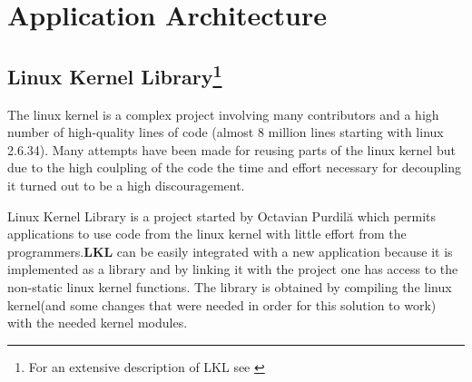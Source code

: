 \chapter{Application Architecture}
\label{chapter:arch}

\section[Linux Kernel Library]{Linux Kernel Library\footnote{For an extensive description of LKL see \cite{thesis}}}
\label{sec:lkl}
The linux kernel is a complex project involving many contributors and a high number of high-quality lines of code (almost 8 million lines starting with linux 2.6.34). Many attempts have been made for reusing parts of the linux kernel but due to the high coulpling of the code the time and effort necessary for decoupling it turned out to be a high discouragement. 

Linux Kernel Library is a project started by Octavian Purdil\u{a} which permits applications to use code from the linux kernel with little effort from the programmers.\textbf{LKL} can be easily integrated with a new application because it is implemented as a library and by linking it with the project one has access to the non-static linux kernel functions. The library is obtained by compiling the linux kernel(and some changes that were needed in order for this solution to work) with the needed kernel modules. 


